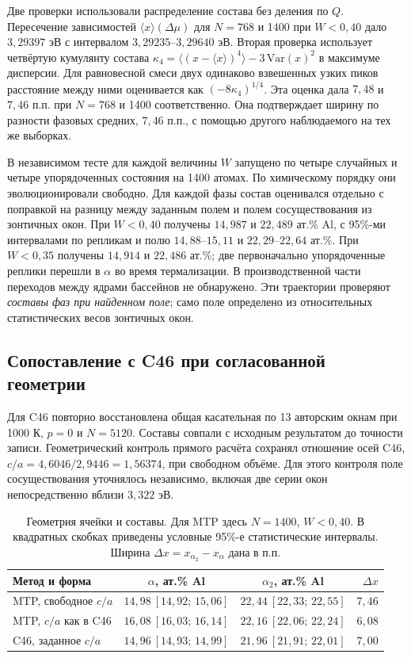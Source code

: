 \documentclass[11pt,a4paper]{article}
\begin{document}
Две проверки использовали распределение состава без деления по $Q$.
Пересечение зависимостей $\langle x\rangle(\Delta\mu)$ для
$N=768$ и 1400 при $W<0{,}40$ дало
$3{,}29397$ эВ с интервалом $3{,}29235$--$3{,}29640$ эВ.
Вторая проверка использует четвёртую кумулянту состава
$\kappa_4=\langle(x-\langle x\rangle)^4\rangle-
3\,\mathrm{Var}(x)^2$ в максимуме дисперсии. Для равновесной смеси
двух одинаково взвешенных узких пиков расстояние между ними
оценивается как $(-8\kappa_4)^{1/4}$. Эта оценка дала
$7{,}48$ и $7{,}46$ п.п. при $N=768$ и 1400 соответственно.
Она подтверждает ширину по разности фазовых средних, $7{,}46$ п.п.,
с помощью другого наблюдаемого на тех же выборках.

В независимом тесте для каждой величины $W$ запущено по четыре
случайных и четыре упорядоченных состояния на 1400 атомах.
По химическому порядку они эволюционировали свободно. Для каждой
фазы состав оценивался отдельно с поправкой на разницу между
заданным полем и полем сосуществования из зонтичных окон.
При $W<0{,}40$ получены $14{,}987$ и $22{,}489$ ат.\% Al,
с 95\%-ми интервалами по репликам и полю $14{,}88$--$15{,}11$
и $22{,}29$--$22{,}64$ ат.\%. При $W<0{,}35$ получены
$14{,}914$ и $22{,}486$ ат.\%; две первоначально упорядоченные
реплики перешли в $\alpha$ во время термализации. В производственной
части переходов между ядрами бассейнов не обнаружено.
Эти траектории проверяют \emph{составы фаз при найденном поле};
само поле определено из относительных статистических весов зонтичных
окон.

\subsection{Сопоставление с C46 при согласованной геометрии}
\label{sec:bulk-c46}

Для C46 повторно восстановлена общая касательная по 13 авторским
окнам при 1000 К, $p=0$ и $N=5120$. Составы совпали с исходным
результатом до точности записи. Геометрический контроль прямого
расчёта сохранял отношение осей C46, $c/a=4{,}6046/2{,}9446
=1{,}56374$, при свободном объёме. Для этого контроля поле
сосуществования уточнялось независимо, включая две серии окон
непосредственно вблизи $3{,}322$ эВ.

\begin{table}[htbp]
\centering\small
\caption{Геометрия ячейки и составы. Для MTP здесь $N=1400$,
$W<0{,}40$. В квадратных скобках приведены условные 95\%-е
статистические интервалы. Ширина $\Delta x=x_{\alpha_2}-x_{\alpha}$
дана в п.п.}
\label{tab:bulk-c46}
\begin{tabular}{@{}l c c r@{}}
\toprule
Метод и форма & $\alpha$, ат.\% Al & $\alpha_2$, ат.\% Al & $\Delta x$\\
\midrule
MTP, свободное $c/a$ & $14{,}98\ [14{,}92;\,15{,}06]$ & $22{,}44\ [22{,}33;\,22{,}55]$ & $7{,}46$\\
MTP, $c/a$ как в C46 & $16{,}08\ [16{,}03;\,16{,}14]$ & $22{,}16\ [22{,}06;\,22{,}24]$ & $6{,}08$\\
C46, заданное $c/a$ & $14{,}96\ [14{,}93;\,14{,}99]$ & $21{,}96\ [21{,}91;\,22{,}01]$ & $7{,}00$\\
\bottomrule
\end{tabular}
\end{table}
\end{document}
